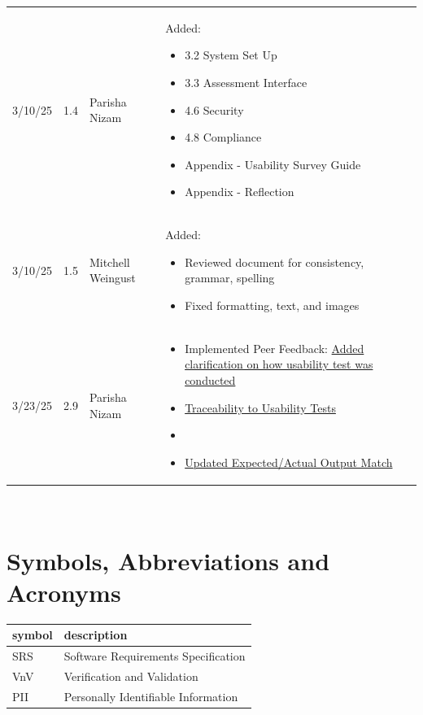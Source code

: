 \documentclass[12pt, titlepage]{article}
\begin{document}
\begin{table}[hp]
\begin{tabularx}{\textwidth}{p{1.5cm}p{1cm}p{3.5cm}X}
  3/10/25 & 1.4 & Parisha Nizam & Added:\begin{itemize}[leftmargin=*]
    \item 3.2 System Set Up
    \item 3.3 Assessment Interface
    \item 4.6 Security
    \item 4.8 Compliance 
    \item Appendix - Usability Survey Guide
    \item Appendix - Reflection
  \end{itemize}\\
  3/10/25 & 1.5 & Mitchell Weingust & Added:\begin{itemize}[leftmargin=*]
    \item Reviewed document for consistency, grammar, spelling
    \item Fixed formatting, text, and images
  \end{itemize}\\
  3/23/25 & 2.9 & Parisha Nizam & \begin{itemize}[leftmargin=*]
    \item Implemented Peer Feedback: \href{https://github.com/parishanizam/TeleHealth/issues/535}{Added clarification on how usability test was conducted}
    \item \href{https://github.com/parishanizam/TeleHealth/issues/537}{Traceability to Usability Tests}
    \item \item \href{https://github.com/parishanizam/TeleHealth/issues/536}{Updated Expected/Actual Output Match}
  \end{itemize}\\

  \bottomrule
  \end{tabularx}
  \end{table}

~\newpage

\section{Symbols, Abbreviations and Acronyms}

\renewcommand{\arraystretch}{1.2}
\begin{tabular}{l l} 
  \toprule		
  \textbf{symbol} & \textbf{description}\\
  \midrule 
  SRS & Software Requirements Specification\\
  VnV & Verification and Validation\\
  PII & Personally Identifiable Information\\
  \bottomrule
\end{tabular}\\
\end{document}
